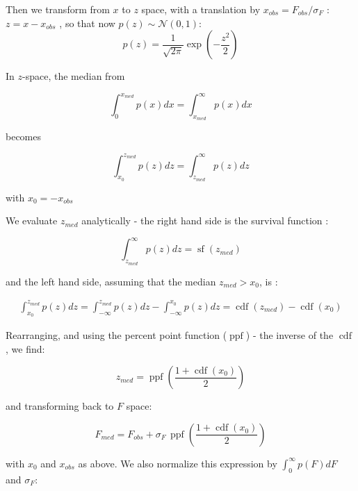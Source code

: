 \documentclass[fleqn,usenatbib]{mnras}  %
\DeclareMathOperator\cdf{cdf}
\DeclareMathOperator\sf{sf}
\DeclareMathOperator\ppf{ppf}
\begin{document}
Then we transform from $x$ to $z$ space, with  a translation by $x_{obs} = F_{obs} / \sigma_{F}$ :  $z = x - x_{obs}$  , so that now  $p(z) \sim \mathcal{N}(0,1)$:
\begin{equation}
p(z) = \frac{1}{\sqrt{2  \pi }} \exp{ \left(-\frac{z^2}{2}\right)}
\end{equation}



In $z$-space, the median from 

\begin{equation}
\int_{0}^{x_{med}} {p(x)dx} = \int_{x_{med}}^{\infty} {p(x)dx}
\end{equation}
 
becomes 

\begin{equation}
\int_{x_{0}}^{z_{med}}{p(z)dz} = \int_{z_{med}}^{\infty}{p(z)dz}
\end{equation}

with  $x_{0}=-x_{obs}$

\bigskip

We evaluate $z_{med}$ analytically  - the right hand side is the survival function  : 

\begin{equation}
\int_{z_{med}}^{\infty}{p(z)dz} = \sf(z_{med})
\end{equation}

and the left hand side, assuming that the median $z_{med} > x_{0}$, is :

\begin{multline}
\int_{x_{0}}^{z_{med}}{p(z)dz} = \int_{-\infty}^{z_{med}}{p(z)dz} - \int_{-\infty}^{x_{0}}{p(z)dz} = \cdf(z_{med}) - \cdf(x_{0})
\end{multline}

Rearranging, and using the percent point function ($\ppf$) - the inverse of the $\cdf$, we find:

\begin{equation}
z_{med} = \ppf \left( \frac{1+\cdf(x_{0})}{2} \right)
\end{equation}

and transforming back to $F$ space: 

\begin{equation}
F_{med} = F_{obs} + \sigma_{F} \, \ppf \left( \frac{1+\cdf(x_{0})}{2} \right)
\end{equation}

with $x_{0}$ and $x_{obs}$ as above.  We also normalize this expression by $\int _{0} ^ {\infty}{ p(F) dF}$ and $\sigma_{F}$:
\end{document}
